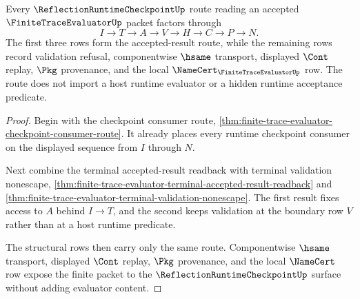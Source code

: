 \begin{theorem}
\label{thm:finite-trace-evaluator-reflection-runtime-route}
Every $\ReflectionRuntimeCheckpointUp$ route reading an accepted
$\FiniteTraceEvaluatorUp$ packet factors through
$$
I \to T \to A \to V \to H \to C \to P \to N.
$$
The first three rows form the accepted-result route, while the remaining rows
record validation refusal, componentwise $\hsame$ transport, displayed
$\Cont$ replay, $\Pkg$ provenance, and the local
$\NameCert_{\FiniteTraceEvaluatorUp}$ row. The route does not import a host
runtime evaluator or a hidden runtime acceptance predicate.
\end{theorem}
\begin{proof}
Begin with the checkpoint consumer route,
\autoref{thm:finite-trace-evaluator-checkpoint-consumer-route}. It already
places every runtime checkpoint consumer on the displayed sequence from $I$
through $N$.

Next combine the terminal accepted-result readback with terminal validation
nonescape,
\autoref{thm:finite-trace-evaluator-terminal-accepted-result-readback} and
\autoref{thm:finite-trace-evaluator-terminal-validation-nonescape}. The first
result fixes access to $A$ behind $I \to T$, and the second keeps validation at
the boundary row $V$ rather than at a host runtime predicate.

The structural rows then carry only the same route. Componentwise $\hsame$
transport, displayed $\Cont$ replay, $\Pkg$ provenance, and the local
$\NameCert$ row expose the finite packet to the
$\ReflectionRuntimeCheckpointUp$ surface without adding evaluator content.
\end{proof}

